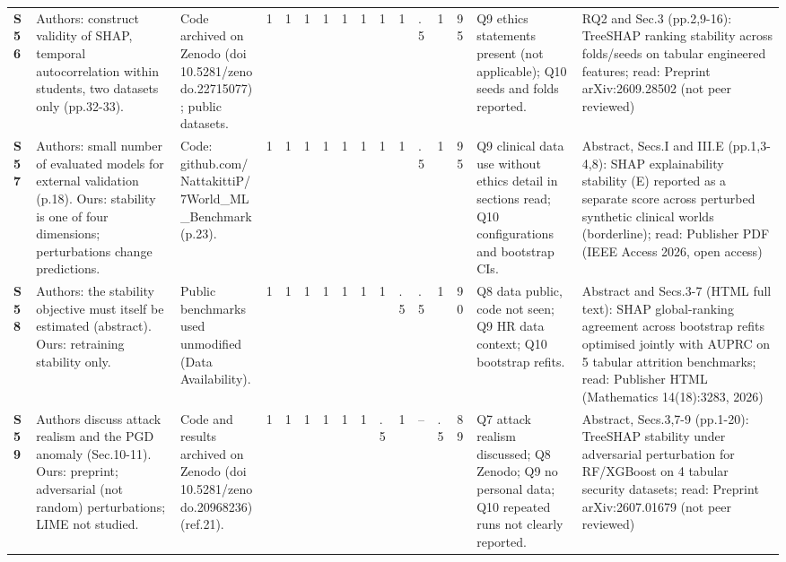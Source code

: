 \begin{longtable}{@{}P{1.0cm}P{4.6cm}P{3.6cm}P{0.3cm}P{0.3cm}P{0.3cm}P{0.3cm}P{0.3cm}P{0.3cm}P{0.3cm}P{0.3cm}P{0.3cm}P{0.36cm}P{0.75cm}P{3.0cm}P{3.9cm}@{}}
\textbf{S56} & Authors: construct validity of SHAP, temporal autocorrelation within students, two datasets only (pp.32-33). & Code archived on Zenodo (doi 10.5281/\allowbreak{}zenodo.22715077); public datasets. & 1 & 1 & 1 & 1 & 1 & 1 & 1 & 1 & .5 & 1 & 95 & Q9 ethics statements present (not applicable); Q10 seeds and folds reported. & RQ2 and Sec.3 (pp.2,9-16): TreeSHAP ranking stability across folds/\allowbreak{}seeds on tabular engineered features; read: Preprint arXiv:2609.28502 (not peer reviewed) \\
\textbf{S57} & Authors: small number of evaluated models for external validation (p.18). Ours: stability is one of four dimensions; perturbations change predictions. & Code: github.com/\allowbreak{}NattakittiP/\allowbreak{}7World\_\allowbreak{}ML\_\allowbreak{}Benchmark (p.23). & 1 & 1 & 1 & 1 & 1 & 1 & 1 & 1 & .5 & 1 & 95 & Q9 clinical data use without ethics detail in sections read; Q10 configurations and bootstrap CIs. & Abstract, Secs.I and III.E (pp.1,3-4,8): SHAP explainability stability (E) reported as a separate score across perturbed synthetic clinical worlds (borderline); read: Publisher PDF (IEEE Access 2026, open access) \\
\textbf{S58} & Authors: the stability objective must itself be estimated (abstract). Ours: retraining stability only. & Public benchmarks used unmodified (Data Availability). & 1 & 1 & 1 & 1 & 1 & 1 & 1 & .5 & .5 & 1 & 90 & Q8 data public, code not seen; Q9 HR data context; Q10 bootstrap refits. & Abstract and Secs.3-7 (HTML full text): SHAP global-ranking agreement across bootstrap refits optimised jointly with AUPRC on 5 tabular attrition benchmarks; read: Publisher HTML (Mathematics 14(18):3283, 2026) \\
\textbf{S59} & Authors discuss attack realism and the PGD anomaly (Sec.10-11). Ours: preprint; adversarial (not random) perturbations; LIME not studied. & Code and results archived on Zenodo (doi 10.5281/\allowbreak{}zenodo.20968236) (ref.21). & 1 & 1 & 1 & 1 & 1 & 1 & .5 & 1 & -- & .5 & 89 & Q7 attack realism discussed; Q8 Zenodo; Q9 no personal data; Q10 repeated runs not clearly reported. & Abstract, Secs.3,7-9 (pp.1-20): TreeSHAP stability under adversarial perturbation for RF/\allowbreak{}XGBoost on 4 tabular security datasets; read: Preprint arXiv:2607.01679 (not peer reviewed) \\

\end{longtable}
